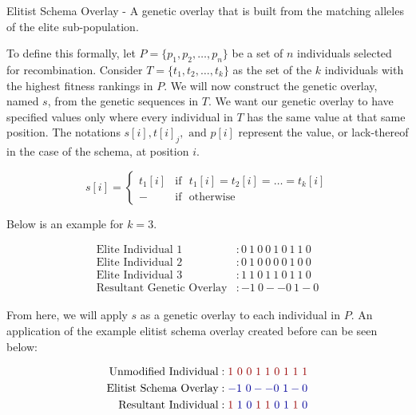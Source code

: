 \begin{overlay}
Elitist Schema Overlay - A genetic overlay that is built from the matching alleles of the elite sub-population.
\end{overlay}

To define this formally, let $P = \{p_1,p_2,\ldots,p_n\}$ be a set of $n$ individuals selected for recombination. Consider $T=\{t_1,t_2,\ldots,t_k\}$ as the set of the $k$ individuals with the highest fitness rankings in $P$. We will now construct the genetic overlay, named $s$, from the genetic sequences in $T$. We want our genetic overlay to  have specified values only where every individual in $T$ has the same value at that same position. The notations $s[i], t[i]_j, \text{ and } p[i]$ represent the value, or lack-thereof in the case of the schema, at position $i$. 
 
 \begin{displaymath}
   s[i] = \left\{
     \begin{array}{cl}
       t_1[i] & \text{if~ } t_1[i] = t_2[i] = \ldots = t_k[i] \\
       - & \text{if~ } \text{otherwise} 
     \end{array}
   \right.
\end{displaymath} 

\noindent Below is an example for $k = 3$.

\begin{align*}
\text{Elite Individual 1} &: 0~1~0~0~1~0~1~1~0 			\\
\text{Elite Individual 2} &: 0~1~0~0~0~0~1~0~0 			\\
\text{Elite Individual 3} &: 1~1~0~1~1~0~1~1~0 			\\  
\text{Resultant Genetic Overlay} &:   -1~0--0~1-0			
\end{align*}

From here, we will apply $s$ as a genetic overlay to each individual in $P$. An application of the example elitist schema overlay created before can be seen below:

\begin{align*}
\text{Unmodified Individual} &: {\color{myred}1~0~0~1~1~0~1~1~1}		\\	
\text{Elitist Schema Overlay} &:   {\color{myblue}-1~0--0~1-0	}		\\  	
\text{Resultant Individual} &:  {\color{myred}1}~{\color{myblue}1~0}~ {\color{myred}1~1}~{\color{myblue}0~1}~ {\color{myred}1}~{\color{myblue}0}
\end{align*}


